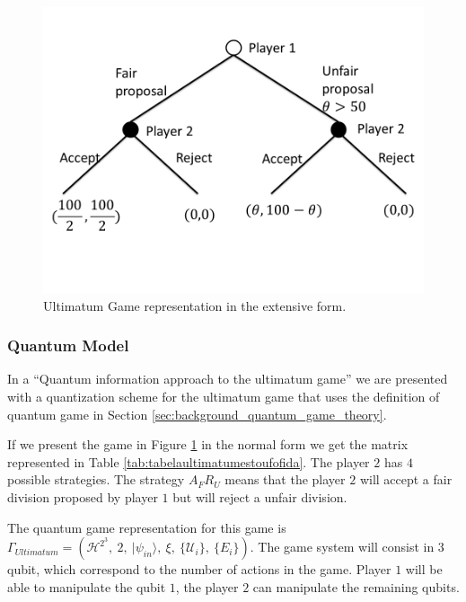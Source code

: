 \begin{figure}[h]
\centering 
\includegraphics[scale=0.35]{Figures/ultimatum/gametree.png}
\caption{Ultimatum Game representation in the extensive form. }
\label{fig:ultimatum:gametree}
\end{figure}

\subsubsection{Quantum Model}
\label{subsec:ultimatum}

In a ``Quantum information approach to the ultimatum game''\cite{Fra2011} we are presented with a quantization scheme for the ultimatum game that uses the definition of quantum game in Section \ref{sec:background_quantum_game_theory}. 

If we present the game in Figure \ref{fig:ultimatum:gametree} in the normal form we get the matrix represented in Table \ref{tab:tabelaultimatumestoufofida}. The player $2$ has $4$ possible strategies. The strategy $A_{F}R_{U}$ means that the player $2$ will accept a fair division proposed by player $1$ but will reject a unfair division.

 The quantum game representation for this game is $
\Gamma_{Ultimatum}=(\mathcal{H}^{2^{3}},\: 2,\:\vert\psi_{in}\rangle,\:\xi,\:\{\mathcal{U}_{i}\},\:\{E_{i}\})\label{eq:quantum_game_six_tuple}
$. The game system will consist in $3$ qubit, which correspond to the number of actions in the game. Player $1$ will be able to manipulate the qubit $1$, the player $2$ can manipulate the remaining qubits. 


